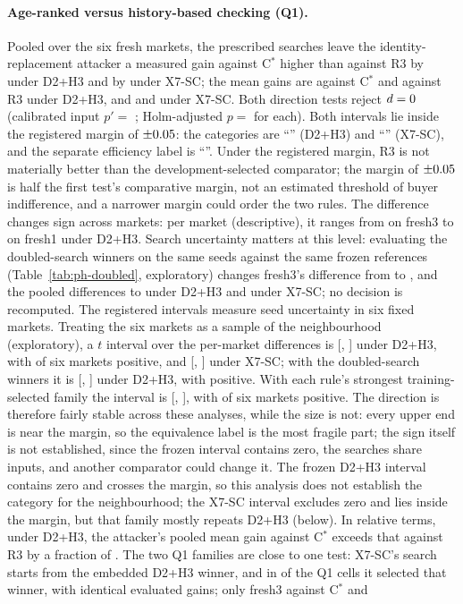 \documentclass[11pt]{article}
\begin{document}
\paragraph{Age-ranked versus history-based checking (Q1).} Pooled over the six fresh markets, the prescribed searches leave the identity-replacement attacker a measured gain against C$^*$ higher than against R3 by  under D2+H3 and by  under X7-SC; the mean gains are  against C$^*$ and  against R3 under D2+H3, and  and  under X7-SC. Both direction tests reject $d = 0$ (calibrated input $p' = $ ; Holm-adjusted $p = $  for each). Both intervals lie inside the registered margin of $\pm0.05$: the categories are ``'' (D2+H3) and ``'' (X7-SC), and the separate efficiency label is ``''. Under the registered margin, R3 is not materially better than the development-selected comparator; the margin of $\pm0.05$ is half the first test's comparative margin, not an estimated threshold of buyer indifference, and a narrower margin could order the two rules. The difference changes sign across markets: per market (descriptive), it ranges from  on fresh3 to  on fresh1 under D2+H3. Search uncertainty matters at this level: evaluating the doubled-search winners on the same seeds against the same frozen references (Table~\ref{tab:ph-doubled}, exploratory) changes fresh3's difference from  to , and the pooled differences to  under D2+H3 and  under X7-SC; no decision is recomputed. The registered intervals measure seed uncertainty in six fixed markets. Treating the six markets as a sample of the neighbourhood (exploratory), a $t$ interval over the per-market differences is [, ] under D2+H3, with  of six markets positive, and [, ] under X7-SC; with the doubled-search winners it is [, ] under D2+H3, with  positive. With each rule's strongest training-selected family the interval is [, ], with  of six markets positive. The direction is therefore fairly stable across these analyses, while the size is not: every upper end is near the margin, so the equivalence label is the most fragile part; the sign itself is not established, since the frozen interval contains zero, the searches share inputs, and another comparator could change it. The frozen D2+H3 interval contains zero and crosses the margin, so this analysis does not establish the category for the neighbourhood; the X7-SC interval excludes zero and lies inside the margin, but that family mostly repeats D2+H3 (below). In relative terms, under D2+H3, the attacker's pooled mean gain against C$^*$ exceeds that against R3 by a fraction of . The two Q1 families are close to one test: X7-SC's search starts from the embedded D2+H3 winner, and in  of the  Q1 cells it selected that winner, with identical evaluated gains; only fresh3 against C$^*$ and 
\end{document}
